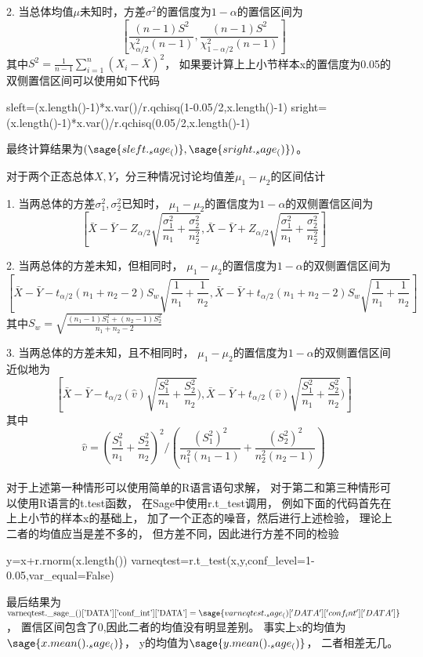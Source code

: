 2. 当总体均值$\mu$未知时，方差$\sigma^2$的置信度为$1-\alpha$的置信区间为
\[\left[ \frac{(n-1)S^2}{\chi_{\alpha/2}^2(n-1)},\frac{(n-1)S^2}{\chi_{1-\alpha/2}^2(n-1)} \right]\]
其中$S^2=\frac{1}{n-1}\sum_{i=1}^n(X_i-\bar{X})^2$，
如果要计算上上小节样本x的置信度为0.05的双侧置信区间可以使用如下代码
\begin{sageblock}
sleft=(x.length()-1)*x.var()/r.qchisq(1-0.05/2,x.length()-1)
sright=(x.length()-1)*x.var()/r.qchisq(0.05/2,x.length()-1)
\end{sageblock}
最终计算结果为$(\sage{sleft._sage_()},\sage{sright._sage_()})$。

对于两个正态总体$X,Y$，分三种情况讨论均值差$\mu_1-\mu_2$的区间估计

1. 当两总体的方差$\sigma_1^2,\sigma_2^2$已知时，
$\mu_1-\mu_2$的置信度为$1-\alpha$的双侧置信区间为
\[\left[
\bar{X}-\bar{Y}-Z_{\alpha/2}\sqrt{\frac{\sigma_1^2}{n_1}+\frac{\sigma_2^2}{n_2^2}},
\bar{X}-\bar{Y}+Z_{\alpha/2}\sqrt{\frac{\sigma_1^2}{n_1}+\frac{\sigma_2^2}{n_2^2}}
\right]\]

2. 当两总体的方差未知，但相同时，
$\mu_1-\mu_2$的置信度为$1-\alpha$的双侧置信区间为
\[\left[
\bar{X}-\bar{Y}-t_{\alpha/2}(n_1+n_2-2)S_w\sqrt{\frac{1}{n_1}+\frac{1}{n_2}},
\bar{X}-\bar{Y}+t_{\alpha/2}(n_1+n_2-2)S_w\sqrt{\frac{1}{n_1}+\frac{1}{n_2}}
\right]\]
其中$S_w=\sqrt{\frac{(n_1-1)S_1^2+(n_2-1)S_2^2}{n_1+n_2-2}}$

3. 当两总体的方差未知，且不相同时，
$\mu_1-\mu_2$的置信度为$1-\alpha$的双侧置信区间近似地为
\[\left[
\bar{X}-\bar{Y}-t_{\alpha/2}(\hat{v})\sqrt{\frac{S_1^2}{n_1}+\frac{S_2^2}{n_2}}),
\bar{X}-\bar{Y}+t_{\alpha/2}(\hat{v})\sqrt{\frac{S_1^2}{n_1}+\frac{S_2^2}{n_2}})
\right]\]
其中
\[\hat{v}=(\frac{S_1^2}{n_1}+\frac{S_2^2}{n_2})^2/
(\frac{(S_1^2)^2}{n_1^2(n_1-1)}+\frac{(S_2^2)^2}{n_2^2(n_2-1)})\]

对于上述第一种情形可以使用简单的R语言语句求解，
对于第二和第三种情形可以使用R语言的t.test函数，
在Sage中使用r.t\_test调用，
例如下面的代码首先在上上小节的样本x的基础上，
加了一个正态的噪音，然后进行上述检验，
理论上二者的均值应当是差不多的，
但方差不同，因此进行方差不同的检验
\begin{sageblock}
y=x+r.rnorm(x.length())
varneqtest=r.t_test(x,y,conf_level=1-0.05,var_equal=False)
\end{sageblock}
最后结果为
$\textrm{varneqtest.\_sage\_()['DATA']['conf\_int']['DATA']}=
\sage{varneqtest._sage_()['DATA']['conf_int']['DATA']}$，
置信区间包含了0,因此二者的均值没有明显差别。
事实上x的均值为$\sage{x.mean()._sage_()}$，
y的均值为$\sage{y.mean()._sage_()}$，
二者相差无几。

